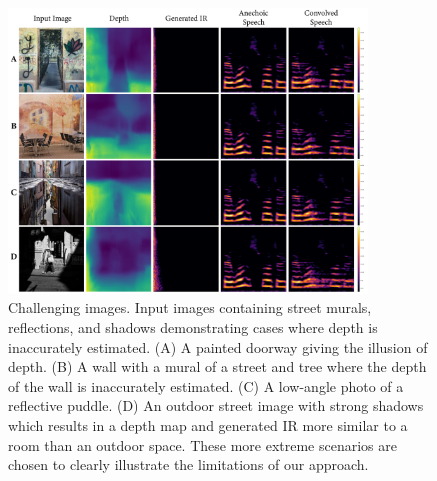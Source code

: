 \begin{figure}
    \centering
    \includegraphics[width=0.85\textwidth]{p_reflection.png}
    \caption{Challenging images. Input images containing street murals, reflections, and shadows demonstrating cases where depth is inaccurately estimated. (A) A painted doorway giving the illusion of depth. (B) A wall with a mural of a street and tree where the depth of the wall is inaccurately estimated. (C) A low-angle photo of a reflective puddle. (D) An outdoor street image with strong shadows which results in a depth map and generated IR more similar to a room than an outdoor space. These more extreme scenarios are chosen to clearly illustrate the limitations of our approach.}
    \label{fig:p_reflection}
\end{figure}


